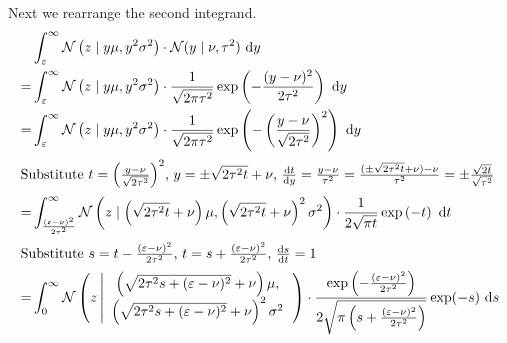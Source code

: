 \documentclass[11pt,a4paper]{book}
\newcommand{\ontopof}[2]{
  \begin{array}{c}
    #1,\\#2
  \end{array}
}
\begin{document}
Next we rearrange the second integrand.
\begin{align*}
  & \int_{\varepsilon}^{\infty} \mathcal{N}\left( z \mid y\mu, y^{2}\sigma^{2} \right) \cdot \mathcal{N}(y \mid \nu, \tau^{2})~\mathrm{d}y\\
  =& \int_{\varepsilon}^{\infty} \mathcal{N}\left( z \mid y\mu, y^{2}\sigma^{2} \right) \cdot \frac{1}{\sqrt{2 \pi \tau^{2}}} \exp\left( -\frac{(y - \nu)^{2}}{2\tau^{2}} \right)~\mathrm{d}y\\
  =& \int_{\varepsilon}^{\infty} \mathcal{N}\left( z \mid y\mu, y^{2}\sigma^{2} \right) \cdot \frac{1}{\sqrt{2 \pi \tau^{2}}} \exp\left( -\left( \frac{y - \nu}{\sqrt{2\tau^{2}}} \right)^{2} \right)~\mathrm{d}y\\
  \intertext{Substitute $t = \left( \frac{y - \nu}{\sqrt{2\tau^{2}}} \right)^{2}$, $y = \pm \sqrt{2\tau^{2} t} + \nu$, $\frac{\mathrm{d}t}{\mathrm{d}y} = \frac{y - \nu}{\tau^{2}} = \frac{(\pm \sqrt{2\tau^{2} t} + \nu) - \nu}{\tau^{2}} = \pm \frac{\sqrt{2t}}{\sqrt{\tau^{2}}}$}
  =& \int_{\frac{(\varepsilon - \nu)^{2}}{2\tau^{2}}}^{\infty} \mathcal{N}\left( z \mid \left( \sqrt{2\tau^{2} t} + \nu \right)\mu, \left( \sqrt{2\tau^{2} t} + \nu \right)^{2}\sigma^{2} \right) \cdot \frac{1}{2\sqrt{\pi t}} \exp\left( -t \right)~\mathrm{d}t\\
  \intertext{Substitute $s = t - \frac{(\varepsilon - \nu)^{2}}{2\tau^{2}}$, $t = s + \frac{(\varepsilon - \nu)^{2}}{2\tau^{2}}$, $\frac{\mathrm{d}s}{\mathrm{d}t} = 1$}
  =& \int_{0}^{\infty} \mathcal{N}\left( z \left| \ontopof{\left( \sqrt{2\tau^{2} s + (\varepsilon - \nu)^{2}} + \nu \right)\mu}{\left( \sqrt{2\tau^{2} s + (\varepsilon - \nu)^{2}} + \nu \right)^{2}\sigma^{2}} \right.\right) \cdot \frac{\exp\left( -\frac{(\varepsilon - \nu)^{2}}{2\tau^{2}} \right)}{2\sqrt{\pi \left( s + \frac{(\varepsilon - \nu)^{2}}{2\tau^{2}} \right)}} \exp(-s)~\mathrm{d}s
\end{align*}
\end{document}
